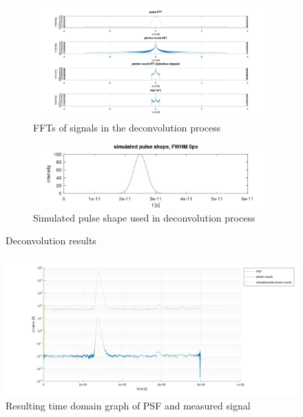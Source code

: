 \documentclass[a4paper]{article}
\begin{document}
\begin{figure}
     \centering
     \begin{subfigure}[b]{1.0\textwidth}
         \centering
        \includegraphics[width=1.0\textwidth]{figures/matlab_deconvolution_all_signals_FFT.jpg}
         \caption{FFTs of signals in the deconvolution process}
         \label{fig:deconvolution_ffts}
     \end{subfigure}
     \hfill
     \begin{subfigure}[b]{1.0\textwidth}
         \centering
         \includegraphics[width=1.0\textwidth]{figures/matlab_deconvolution_pulse.jpg}
         \caption{Simulated pulse shape used in deconvolution process}
         \label{fig:deconvolution_pulse}
     \end{subfigure}
        \caption{Deconvolution results}
        \label{fig:deconvolution_graphs}
\end{figure}

\begin{figure}
\centering
\includegraphics[width=1.0\textwidth]{figures/matlab_deconvolution_all_signals.jpg}
\caption{\label{fig:deconvolution_time_domain}Resulting time domain graph of PSF and measured signal}
\end{figure}
\end{document}
